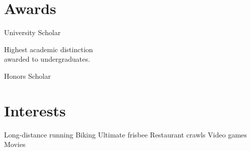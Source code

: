 \documentclass[]{deedy-resume}
\begin{document}
\begin{minipage}[t]{0.38\textwidth}

\section{Awards}
University Scholar \\
\begin{tightemize}
\item Highest academic distinction \\ awarded to undergraduates.
\end{tightemize}
Honors Scholar


\section{Interests}
Long-distance running \textbullet{} Biking \textbullet{}
Ultimate frisbee \textbullet{} Restaurant crawls \textbullet{}
Video games \textbullet{} Movies

%
%

\end{minipage}
\hfill
\end{document}
